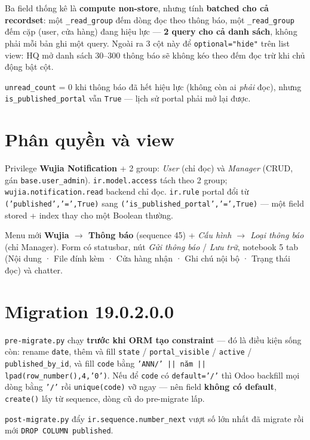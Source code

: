 Ba field thống kê là \textbf{compute non-store}, nhưng tính \textbf{batched cho cả recordset}:
một \texttt{\_read\_group} đếm dòng đọc theo thông báo, một \texttt{\_read\_group} đếm cặp
(user, cửa hàng) đang hiệu lực --- \textbf{2 query cho cả danh sách}, không phải mỗi bản ghi một
query. Ngoài ra 3 cột này để \texttt{optional="hide"} trên list view: HQ mở danh sách 30--300
thông báo sẽ không kéo theo đếm đọc trừ khi chủ động bật cột.

\texttt{unread\_count} = 0 khi thông báo đã hết hiệu lực (không còn ai \emph{phải} đọc), nhưng
\texttt{is\_published\_portal} vẫn \texttt{True} --- lịch sử portal phải mở lại được.

\section{Phân quyền và view}

Privilege \textbf{Wujia Notification} + 2 group: \emph{User} (chỉ đọc) và \emph{Manager} (CRUD,
gán \texttt{base.user\_admin}). \texttt{ir.model.access} tách theo 2 group; \texttt{wujia.notification.read}
backend chỉ đọc. \texttt{ir.rule} portal đổi từ \texttt{('published','=',True)} sang
\texttt{('is\_published\_portal','=',True)} --- một field stored + index thay cho một Boolean thường.

Menu mới \textbf{Wujia $\to$ Thông báo} (sequence 45) + \emph{Cấu hình $\to$ Loại thông báo}
(chỉ Manager). Form có statusbar, nút \emph{Gửi thông báo} / \emph{Lưu trữ}, notebook 5 tab
(Nội dung · File đính kèm · Cửa hàng nhận · Ghi chú nội bộ · Trạng thái đọc) và chatter.

\section{Migration 19.0.2.0.0}

\texttt{pre-migrate.py} chạy \textbf{trước khi ORM tạo constraint} --- đó là điều kiện sống còn:
rename \texttt{date}, thêm và fill \texttt{state} / \texttt{portal\_visible} / \texttt{active} /
\texttt{published\_by\_id}, và fill \texttt{code} bằng
\texttt{'ANN/' || năm || lpad(row\_number(),4,'0')}. Nếu để \texttt{code} có
\texttt{default='/'} thì Odoo backfill mọi dòng bằng \texttt{'/'} rồi \texttt{unique(code)}
vỡ ngay --- nên field \textbf{không có default}, \texttt{create()} lấy từ sequence, dòng cũ do
pre-migrate lấp.

\texttt{post-migrate.py} đẩy \texttt{ir.sequence.number\_next} vượt số lớn nhất đã migrate rồi mới
\texttt{DROP COLUMN published}.

